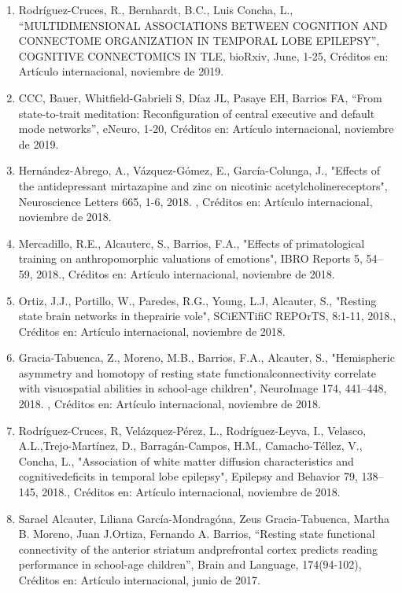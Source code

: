 \documentclass[12pt]{article}
\begin{document}
\begin{enumerate}
\item Rodríguez-Cruces, R., Bernhardt, B.C., Luis Concha, L., “MULTIDIMENSIONAL ASSOCIATIONS BETWEEN COGNITION AND CONNECTOME 
ORGANIZATION IN TEMPORAL LOBE EPILEPSY”, COGNITIVE CONNECTOMICS IN TLE, bioRxiv, June, 1-25, Créditos en: Artículo internacional, 
noviembre de 2019.

\item CCC, Bauer, Whitfield-Gabrieli S, Díaz JL, Pasaye EH, Barrios FA, “From state-to-trait meditation: Reconfiguration of central 
executive and default mode networks”, eNeuro, 1-20, Créditos en: Artículo internacional, noviembre de 2019.

\item Hernández-Abrego, A., Vázquez-Gómez, E., García-Colunga, J., "Effects of the antidepressant mirtazapine and zinc on nicotinic 
acetylcholinereceptors", Neuroscience Letters 665, 1-6, 2018. , Créditos en: Artículo internacional, noviembre de 2018.

\item Mercadillo, R.E., Alcauterc, S., Barrios, F.A., "Effects of primatological training on anthropomorphic valuations of emotions", 
IBRO Reports 5, 54–59, 2018., Créditos en: Artículo internacional, noviembre de 2018.

\item Ortiz, J.J., Portillo, W., Paredes, R.G., Young, L.J, Alcauter, S., "Resting state brain networks in theprairie vole", SCiENTifiC 
REPOrTS, 8:1-11, 2018., Créditos en: Artículo internacional, noviembre de 2018.

\item Gracia-Tabuenca, Z., Moreno, M.B., Barrios, F.A., Alcauter, S., "Hemispheric asymmetry and homotopy of resting state 
functionalconnectivity correlate with visuospatial abilities in school-age children", NeuroImage 174, 441–448, 2018. , Créditos en: 
Artículo internacional, noviembre de 2018.

\item Rodríguez-Cruces, R, Velázquez-Pérez, L., Rodríguez-Leyva, I., Velasco, A.L.,Trejo-Martínez, D., Barragán-Campos, H.M., 
Camacho-Téllez, V., Concha, L., "Association of white matter diffusion characteristics and cognitivedeficits in temporal lobe 
epilepsy", Epilepsy and Behavior 79, 138–145, 2018., Créditos en: Artículo internacional, noviembre de 2018.

\item Sarael Alcauter, Liliana García-Mondragóna, Zeus Gracia-Tabuenca, Martha B. Moreno, Juan J.Ortiza, Fernando A. Barrios, “Resting 
state functional connectivity of the anterior striatum andprefrontal cortex predicts reading performance in school-age children”, Brain 
and Language, 174(94-102), Créditos en: Artículo internacional, junio de 2017.


\end{enumerate}
\end{document}
